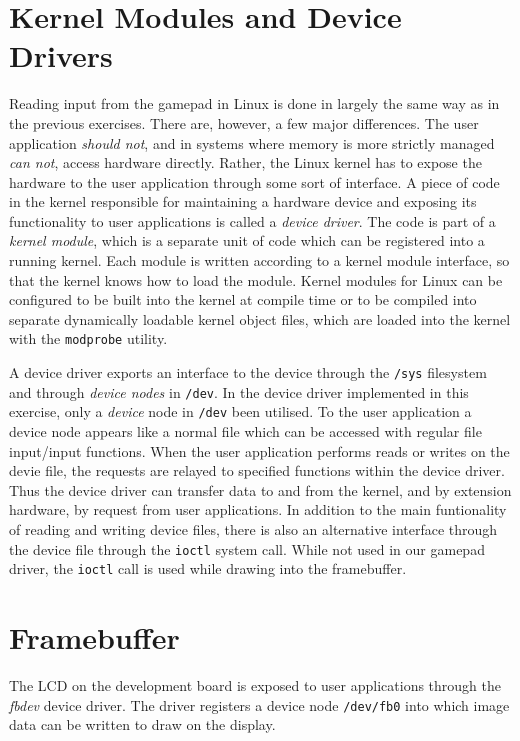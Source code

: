 \section{Kernel Modules and Device Drivers}

Reading input from the gamepad in Linux is done in largely the same way as in
the previous exercises. There are, however, a few major differences. The user
application \emph{should not}, and in systems where memory is more strictly
managed \emph{can not}, access hardware directly. Rather, the Linux kernel has
to expose the hardware to the user application through some sort of interface.
A piece of code in the kernel responsible for maintaining a hardware device and
exposing its functionality to user applications is called a \emph{device
driver}. The code is part of a \emph{kernel module}, which is a separate unit of
code which can be registered into a running kernel. Each module is written
according to a kernel module interface, so that the kernel knows how to load the
module. Kernel modules for Linux can be configured to be built into the kernel
at compile time or to be compiled into separate dynamically loadable kernel
object files, which are loaded into the kernel with the \texttt{modprobe}
utility.

A device driver exports an interface to the device through the \texttt{/sys}
filesystem and through \emph{device nodes} in \texttt{/dev}. In the device
driver implemented in this exercise, only a \emph{device} node in \texttt{/dev}
been utilised. To the user application a device node appears like a normal file
which can be accessed with regular file input/input functions. When the user
application performs reads or writes on the devie file, the requests are relayed
to specified functions within the device driver. Thus the device driver can
transfer data to and from the kernel, and by extension hardware, by request from
user applications. In addition to the main funtionality of reading and writing
device files, there is also an alternative interface through the device file
through the \texttt{ioctl} system call. While not used in our gamepad driver,
the \texttt{ioctl} call is used while drawing into the framebuffer.

\section{Framebuffer}

The LCD on the development board is exposed to user applications through the
\emph{fbdev} device driver. The driver registers a device node \texttt{/dev/fb0}
into which image data can be written to draw on the display.
